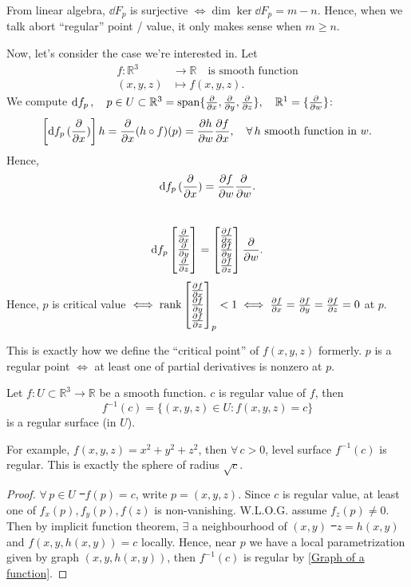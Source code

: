 From linear algebra, \(\dd{F_p}\) is surjective \(\iff \dim\ker\dd{F_p}=m-n\).
Hence, when we talk abort ``regular'' point / value, it only makes sense when
\(m\ge n\).

Now, let's consider the case we're interested in. Let
\begin{align*}
    f\colon\mathbb{R}^3 &\longrightarrow \mathbb{R}\quad\text{is smooth function} \\
    (x,y,z) &\longmapsto f(x,y,z)
.\end{align*}
We compute \(\dd{f_p},\quad p\in U\subset \mathbb{R}^3=\operatorname{span}\{\pdv{x},\pdv{y},
\pdv{z}\},\quad\mathbb{R}^1=\{\pdv{w}\}\): \[
    \left[ \dd{f_p}(\pdv{x}) \right] h=\pdv{x}(h\circ f)(p)=\pdv{h}{w}\pdv{f}{x},
    \quad\forall\, h\text{ smooth function in } w
.\]
Hence, \[
    \dd{f_p}(\pdv{x})=\pdv{f}{w}(p)\pdv{w}
.\] \ie\ \[
    \dd{f_p}\begin{bmatrix}
        \pdv{x} \\
        \pdv{y} \\
        \pdv{z}
    \end{bmatrix}
    =\begin{bmatrix}
        \pdv{f}{x} \\
        \pdv{f}{y} \\
        \pdv{f}{z}
    \end{bmatrix}\pdv{w}
.\] Hence, \(p\) is critical value \(\iff \rank\begin{bmatrix}
    \pdv{f}{x} \\
    \pdv{f}{y} \\
    \pdv{f}{z}
\end{bmatrix}_p<1
\iff \pdv{f}{x}=\pdv{f}{y}=\pdv{f}{z}=0\) at \(p\).

This is exactly how we define the ``critical point'' of \(f(x,y,z)\) formerly.
\(p\) is a regular point \(\iff \) at least one of partial derivatives is nonzero
at \(p\).

\begin{prop}
    Let \(f\colon U\subset\mathbb{R}^3\to \mathbb{R}\) be a smooth function. \(c\)
    is regular value of \(f\), then \[
        f^{-1}(c)=\{(x,y,z)\in U:f(x,y,z)=c\}
    \] is a regular surface (in \(U\)).
\end{prop}

For example, \(f(x,y,z)=x^2+y^2+z^2\), then \(\forall\,c>0\), level surface
\(f^{-1}(c)\) is regular. This is exactly the sphere of radius \(\sqrt{c}\).

\begin{proof}
    \(\forall\,p\in U\) \st\ \(f(p)=c\), write \(p=(x,y,z)\). Since \(c\) is regular
    value, at least one of \(f_x(p),f_y(p),f(z)\) is non-vanishing. W.L.O.G. assume
    \(f_z(p)\neq 0\). Then by implicit function theorem, \(\exists\) a neighbourhood
    of \((x,y)\) \st\ \(z=h(x,y)\) and \(f(x,y,h(x,y))=c\) locally.
    Hence, near \(p\) we have a local parametrization given by graph \((x,y,h(x,y))\),
    then \(f^{-1}(c)\) is regular by \cref{Graph of a function}.
\end{proof}

